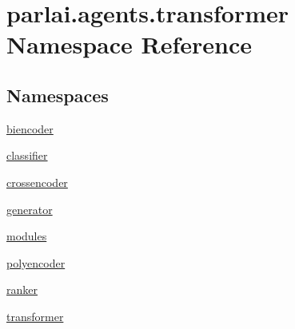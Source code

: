 \hypertarget{namespaceparlai_1_1agents_1_1transformer}{}\section{parlai.\+agents.\+transformer Namespace Reference}
\label{namespaceparlai_1_1agents_1_1transformer}
\subsection*{Namespaces}
\begin{DoxyCompactItemize}
\item 
 \hyperlink{namespaceparlai_1_1agents_1_1transformer_1_1biencoder}{biencoder}
\item 
 \hyperlink{namespaceparlai_1_1agents_1_1transformer_1_1classifier}{classifier}
\item 
 \hyperlink{namespaceparlai_1_1agents_1_1transformer_1_1crossencoder}{crossencoder}
\item 
 \hyperlink{namespaceparlai_1_1agents_1_1transformer_1_1generator}{generator}
\item 
 \hyperlink{namespaceparlai_1_1agents_1_1transformer_1_1modules}{modules}
\item 
 \hyperlink{namespaceparlai_1_1agents_1_1transformer_1_1polyencoder}{polyencoder}
\item 
 \hyperlink{namespaceparlai_1_1agents_1_1transformer_1_1ranker}{ranker}
\item 
 \hyperlink{namespaceparlai_1_1agents_1_1transformer_1_1transformer}{transformer}
\end{DoxyCompactItemize}
